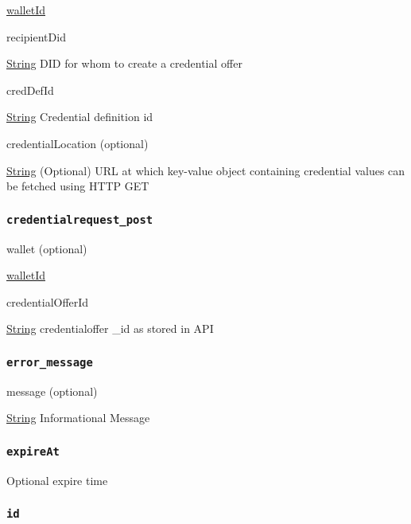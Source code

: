 {\protect\hyperlink{walletId}{walletId}}

recipientDid

{\protect\hyperlink{string}{String}} DID for whom to create a credential
offer

credDefId

{\protect\hyperlink{string}{String}} Credential definition id

credentialLocation (optional)

{\protect\hyperlink{string}{String}} (Optional) URL at which key-value
object containing credential values can be fetched using HTTP GET

\hypertarget{credentialrequest_post}{%
\subsubsection{\texorpdfstring{\protect\hypertarget{credentialrequest_post}{}{\texttt{credentialrequest\_post}}}{credentialrequest\_post}}\label{credentialrequest_post}}

wallet (optional)

{\protect\hyperlink{walletId}{walletId}}

credentialOfferId

{\protect\hyperlink{string}{String}} credentialoffer \_id as stored in
API

\hypertarget{error_message}{%
\subsubsection{\texorpdfstring{\protect\hypertarget{error_message}{}{\texttt{error\_message}}}{error\_message}}\label{error_message}}

message (optional)

{\protect\hyperlink{string}{String}} Informational Message

\hypertarget{expireat}{%
\subsubsection{\texorpdfstring{\protect\hypertarget{expireAt}{}{\texttt{expireAt}}}{expireAt}}\label{expireat}}

Optional expire time

\hypertarget{id}{%
\subsubsection{\texorpdfstring{\protect\hypertarget{id}{}{\texttt{id}}}{id}}\label{id}}

